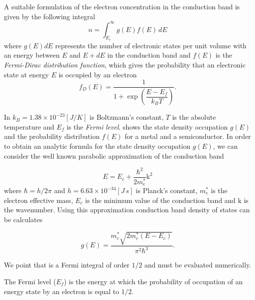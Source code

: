 A suitable formulation of the electron concentration in the conduction band is given by the following integral
\begin{equation}
\label{eq: carrier densiy integral}
n = \int_{E_c}^\infty g(E)f(E) \, dE
\end{equation}
where $g(E)dE$ represents the number of electronic states per unit volume with an energy between $E$ and $E+dE$ in the conduction band and $f(E)$ is the \textit{Fermi-Dirac distribution function}, which gives the probability that an electronic state at energy $E$ is occupied by an electron
\begin{equation}
\label{eq: fermi dirac distribution}
f_D(E) = \dfrac{1}{1+\exp\left(\dfrac{E-E_f}{k_BT}\right)} .
\end{equation}

In  $k_B=1.38\times10^{-23}[J/K]$ is Boltzmann's constant, $T$ is the absolute temperature and $E_f$ is the \textit{Fermi level}. 
 shows  the state density occupation $g(E)$ and the probability distribution $f(E)$ for a metal and a semiconductor. In order to obtain an analytic formula for the state density occupation $g(E)$, we can consider the well known parabolic approximation of the conduction band \cite{Pierret:SemiFunda}

\begin{equation}
\label{eq: approssimazione banda di conduzione}
E = E_c + \dfrac{\hbar^2}{2m_e^*}\mathrm{k}^2
\end{equation}
where $\hbar=h/2\pi$ and $h=6.63 \times 10^{-34} [J \, s]$ is Planck's constant, $m_e^*$ is the electron effective mass, $E_c$ is the minimum value of the conduction band and $\mathrm{k}$ is the wavenumber. Using this approximation conduction band density of states can be calculates

\begin{equation}
\label{eq: state density electron}
g(E) = \dfrac{m_e^*\sqrt{2m_e^*(E-E_c)}}{\pi^2\hbar^3}.
\end{equation}

We point that  is a Fermi integral of order $1/2$ and must be evaluated numerically.
 
\begin{Definizione}
The Fermi level ($E_f$) is the energy at which the probability of occupation of an energy state by an electron is equal to $1/2$.
\end{Definizione}

